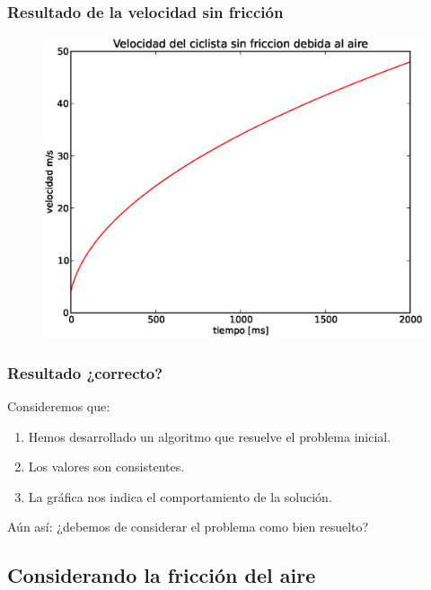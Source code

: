 \documentclass[12pt]{beamer}
\begin{document}
\begin{frame}
\frametitle{Resultado de la velocidad sin fricción}
\begin{figure}[H]
	\centering
	\includegraphics[scale=0.475]{Imagenes/EjerBicicleta01.eps}
\end{figure}
\end{frame}
\begin{frame}
\frametitle{Resultado ¿correcto?}
Consideremos que:
\begin{enumerate}[<+->]
\item Hemos desarrollado un algoritmo que resuelve el problema inicial.
\item Los valores son consistentes.
\item La gráfica nos indica el comportamiento de la solución.
\end{enumerate}
\pause
Aún así: ¿debemos de considerar el problema como bien resuelto? \pause {}
\end{frame}

\subsection{Considerando la fricción del aire}
\end{document}
